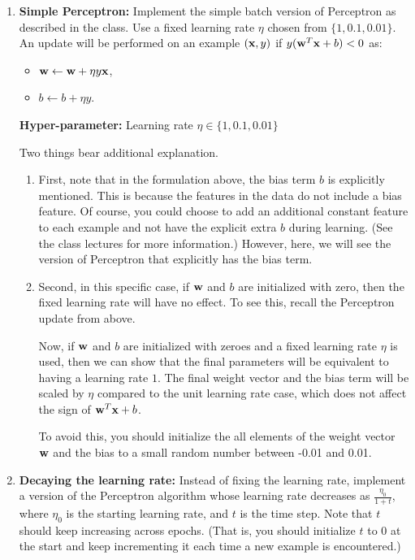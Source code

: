 \begin{enumerate}
\item \textbf{Simple Perceptron:} Implement the simple batch version
  of Perceptron as described in the class. Use a fixed learning rate
  $\eta$ chosen from $\{1,0.1,0.01\}$. An update will be performed on
  an example $({\bf x}, y)$ if $y({\bf w}^T{\bf x} + b) < 0$ as:
  \begin{itemize}
  \item[] ${\bf w} \leftarrow {\bf w} + \eta y {\bf x}$,
  \item[] $b \leftarrow b + \eta y$.
  \end{itemize}

  \textbf{Hyper-parameter:} Learning rate $\eta\in\{1,0.1,0.01\}$

  Two things bear additional explanation. 

  \begin{enumerate}
  \item First, note that in the formulation above, the bias term $b$
    is explicitly mentioned. This is because the features in the data
    do not include a bias feature. Of course, you could choose to add
    an additional constant feature to each example and not have the
    explicit extra $b$ during learning. (See the class lectures for
    more information.) However, here, we will see the version of
    Perceptron that explicitly has the bias term.
  \item Second, in this specific case, if ${\bf w}$ and $b$ are
    initialized with zero, then the fixed learning rate will have no
    effect. To see this, recall the Perceptron update from above.
    
    Now, if ${\bf w}$ and $b$ are initialized with zeroes and a fixed
    learning rate $\eta$ is used, then we can show that the final
    parameters will be equivalent to having a learning rate $1$. The
    final weight vector and the bias term will be scaled by $\eta$
    compared to the unit learning rate case, which does not affect the
    sign of ${\bf w}^T{\bf x} + b$.
    
    To avoid this, you should initialize the all elements of the
    weight vector ${\bf w}$ and the bias to a small random number between
    -0.01 and 0.01.
    
  \end{enumerate}

\item \textbf{Decaying the learning rate:} Instead of fixing the
  learning rate, implement a version of the Perceptron algorithm
  whose learning rate decreases as $\frac{\eta_0}{1+t}$, where
  $\eta_0$ is the starting learning rate, and $t$ is the time
  step. Note that $t$ should keep increasing across epochs. (That
  is, you should initialize $t$ to $0$ at the start and keep
  incrementing it each time a new example is encountered.)


\end{enumerate}
